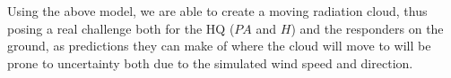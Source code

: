 Using the above model, we are able to create a moving radiation cloud, thus posing a real challenge both for the HQ ($PA$ and $H$) and the responders on the ground, as predictions they can make of where the cloud will move to will be prone to uncertainty both due to the simulated wind speed and direction. 


%
